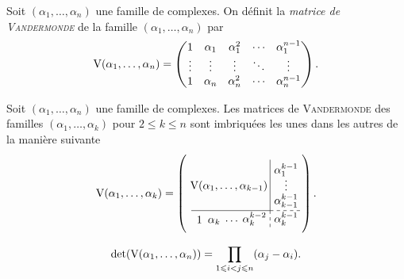 \begin{defi}
    Soit $(\alpha_1, \dots, \alpha_n)$ une famille de complexes. On définit la \emph{matrice de \textsc{Vandermonde}} de la famille $(\alpha_1, \dots, \alpha_n)$ par
    $$\mathrm{V}(\alpha_1, \dots, \alpha_n) = \begin{pmatrix}
    1 & \alpha_1 & \alpha_1^2 & \cdots & \alpha_1^{n-1} \\
    \vdots & \vdots & \vdots & \ddots & \vdots \\
    1 & \alpha_n & \alpha_n^2 & \cdots & \alpha_n^{n-1}
    \end{pmatrix}.$$
\end{defi}

\newcommand{\vandk}{
\left(\begin{gathered}
    \tikzpicture[every node/.style={anchor=south west}]
        \node[minimum width=2cm,minimum height=1.5cm] at (-0.16,0.625) {$\Vandermonde(\alpha_1, \dots, \alpha_{k-1})$};
        \node[minimum width=0.5cm,minimum height=0.5cm] at (0,0.05) {$1$};
        \node[minimum width=0.5cm,minimum height=0.5cm] at (0.4, 0) {$\alpha_{k}$};
        \node[minimum width=0.5cm,minimum height=0.5cm] at (0.95,0) {$\cdots$};
        \node[minimum width=0.5cm,minimum height=0.5cm] at (1.5,0) {$\alpha_{k}^{k-2}$};
        \node[minimum width=1cm,minimum height=0.5cm] at (2.5,0) {$\alpha_{k}^{k-1}$};
        \node[minimum width=1cm,minimum height=1cm] at (2.5,0.4) {$\alpha_{k-1}^{k-1}$};
        \node[minimum width=1cm,minimum height=1cm] at (2.5,1) {$\vdots$};
        \node[minimum width=1cm,minimum height=1cm] at (2.5,1.4) {$\alpha_1^{k-1}$};
        \draw (0,0.6) -- (2.5,0.6);
        \draw (2.5,0.6) -- (2.5,2.225);
        \draw[dashed] (2.5,0.6) -- (3.5,0.6);
        \draw[dashed] (2.5,0.6) -- (2.5,0);
    \endtikzpicture
    \end{gathered}\right)
}

\begin{remarque}
    Soit $(\alpha_1, \dots, \alpha_n)$ une famille de complexes. Les matrices de \textsc{Vandermonde} des familles $(\alpha_1, \dots, \alpha_k)$ pour $2 \leqslant k \leqslant n$ sont imbriquées les unes dans les autres de la manière suivante
    $$\Vandermonde(\alpha_1, \dots, \alpha_k) = \vandk.$$
\end{remarque}

\begin{prop}
    $$\det (\mathrm{V}(\alpha_1, \dots, \alpha_n)) = \prod_{1\leqslant i < j \leqslant n}(\alpha_j - \alpha_i).$$
\end{prop}

